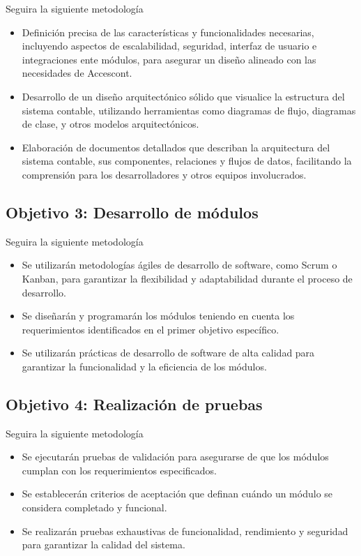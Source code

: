 \documentclass{article}
\begin{document}
Seguira la siguiente metodología

\begin{itemize}
    \item Definición precisa de las características y funcionalidades necesarias, incluyendo aspectos de escalabilidad, seguridad, interfaz de usuario e integraciones ente módulos, para asegurar un diseño alineado con las necesidades de Accescont.
    \item Desarrollo de un diseño arquitectónico sólido que visualice la estructura del sistema contable, utilizando herramientas como diagramas de flujo, diagramas de clase, y otros modelos arquitectónicos.
    \item Elaboración de documentos detallados que describan la arquitectura del sistema contable, sus componentes, relaciones y flujos de datos, facilitando la comprensión para los desarrolladores y otros equipos involucrados.
\end{itemize}

\subsection{Objetivo 3: Desarrollo de módulos}

Seguira la siguiente metodología

\begin{itemize}
    \item Se utilizarán metodologías ágiles de desarrollo de software, como Scrum o Kanban, para garantizar la flexibilidad y adaptabilidad durante el proceso de desarrollo.
    \item Se diseñarán y programarán los módulos teniendo en cuenta los requerimientos identificados en el primer objetivo específico.
    \item Se utilizarán prácticas de desarrollo de software de alta calidad para garantizar la funcionalidad y la eficiencia de los módulos.
\end{itemize}

\subsection{Objetivo 4: Realización de pruebas}

Seguira la siguiente metodología

\begin{itemize}
    \item Se ejecutarán pruebas de validación para asegurarse de que los módulos cumplan con los requerimientos especificados.
    \item Se establecerán criterios de aceptación que definan cuándo un módulo se considera completado y funcional.
    \item Se realizarán pruebas exhaustivas de funcionalidad, rendimiento y seguridad para garantizar la calidad del sistema.
\end{itemize}
\end{document}
